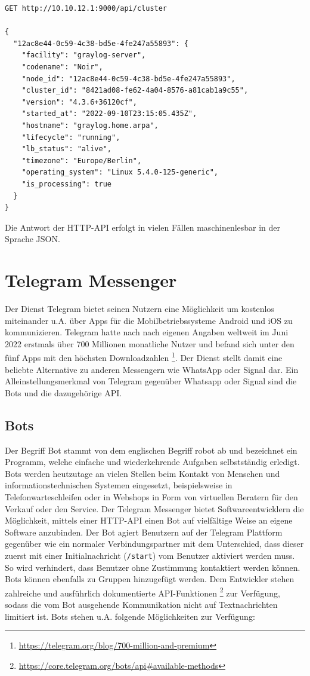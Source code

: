 \begin{lstlisting}[caption={Beispiel eines Aufrufs der Graylog REST-API.}, label=bsp-rest-api]
GET http://10.10.12.1:9000/api/cluster

{
  "12ac8e44-0c59-4c38-bd5e-4fe247a55893": {
    "facility": "graylog-server",
    "codename": "Noir",
    "node_id": "12ac8e44-0c59-4c38-bd5e-4fe247a55893",
    "cluster_id": "8421ad08-fe62-4a04-8576-a81cab1a9c55",
    "version": "4.3.6+36120cf",
    "started_at": "2022-09-10T23:15:05.435Z",
    "hostname": "graylog.home.arpa",
    "lifecycle": "running",
    "lb_status": "alive",
    "timezone": "Europe/Berlin",
    "operating_system": "Linux 5.4.0-125-generic",
    "is_processing": true
  }
}
\end{lstlisting}

Die Antwort der HTTP-API erfolgt in vielen Fällen maschinenlesbar in der Sprache JSON.

\section{Telegram Messenger}

Der Dienst Telegram bietet seinen Nutzern eine Möglichkeit um kostenlos miteinander u.A. über Apps für die Mobilbetriebssysteme Android und iOS zu kommunizieren. Telegram hatte nach nach eigenen Angaben weltweit im Juni 2022 erstmals über 700 Millionen monatliche Nutzer und befand sich unter den fünf Apps mit den höchsten Downloadzahlen \footnote{\url{https://telegram.org/blog/700-million-and-premium}}. Der Dienst stellt damit eine beliebte Alternative zu anderen Messengern wie WhatsApp oder Signal dar. Ein Alleinstellungsmerkmal von Telegram gegenüber Whatsapp oder Signal sind die Bots und die dazugehörige API.

\subsection{Bots}

Der Begriff Bot stammt von dem englischen Begriff robot ab und bezeichnet ein Programm, welche einfache und wiederkehrende Aufgaben selbstständig erledigt. Bots werden heutzutage an vielen Stellen beim Kontakt von Menschen und informationstechnischen Systemen eingesetzt, beispielsweise in Telefonwarteschleifen oder in Webshops in Form von virtuellen Beratern für den Verkauf oder den Service. Der Telegram Messenger bietet Softwareentwicklern die Möglichkeit, mittels einer HTTP-API einen Bot auf vielfältige Weise an eigene Software anzubinden. Der Bot agiert Benutzern auf der Telegram Plattform gegenüber wie ein normaler Verbindungspartner mit dem Unterschied, dass dieser zuerst mit einer Initialnachricht (\lstinline{/start}) vom Benutzer aktiviert werden muss. So wird verhindert, dass  Benutzer ohne Zustimmung kontaktiert werden können. Bots können ebenfalls zu Gruppen hinzugefügt werden. Dem Entwickler stehen zahlreiche und ausführlich dokumentierte API-Funktionen \footnote{\url{https://core.telegram.org/bots/api\#available-methods}} zur Verfügung, sodass die vom Bot ausgehende Kommunikation nicht auf Textnachrichten limitiert ist. Bots stehen u.A. folgende Möglichkeiten zur Verfügung:


